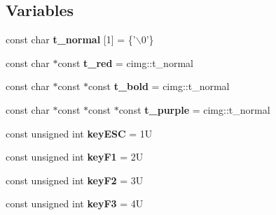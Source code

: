 \subsection*{Variables}
\begin{DoxyCompactItemize}
\item 
\hypertarget{namespacecimg__library_1_1cimg_a21ef52a3c2df8f112ed0cd94c0ff7417}{
const char {\bfseries t\_\-normal} \mbox{[}1\mbox{]} = \{'$\backslash$0'\}}
\label{namespacecimg__library_1_1cimg_a21ef52a3c2df8f112ed0cd94c0ff7417}

\item 
\hypertarget{namespacecimg__library_1_1cimg_a6ecafe64a12753c164fc400a891702fc}{
const char $\ast$const {\bfseries t\_\-red} = cimg::t\_\-normal}
\label{namespacecimg__library_1_1cimg_a6ecafe64a12753c164fc400a891702fc}

\item 
\hypertarget{namespacecimg__library_1_1cimg_adf940f5d27878472849db5021c8d6570}{
const char $\ast$const $\ast$const {\bfseries t\_\-bold} = cimg::t\_\-normal}
\label{namespacecimg__library_1_1cimg_adf940f5d27878472849db5021c8d6570}

\item 
\hypertarget{namespacecimg__library_1_1cimg_a56bfd6a63beb2cf797e8d97724e9390a}{
const char $\ast$const $\ast$const $\ast$const {\bfseries t\_\-purple} = cimg::t\_\-normal}
\label{namespacecimg__library_1_1cimg_a56bfd6a63beb2cf797e8d97724e9390a}

\item 
\hypertarget{namespacecimg__library_1_1cimg_adfae078959b4ad6d1695828a533088b0}{
const unsigned int {\bfseries keyESC} = 1U}
\label{namespacecimg__library_1_1cimg_adfae078959b4ad6d1695828a533088b0}

\item 
\hypertarget{namespacecimg__library_1_1cimg_a77b15159148b47f4b1088e5d76305439}{
const unsigned int {\bfseries keyF1} = 2U}
\label{namespacecimg__library_1_1cimg_a77b15159148b47f4b1088e5d76305439}

\item 
\hypertarget{namespacecimg__library_1_1cimg_a0d23f41f3a6ffef9c9bec1dd8e705d30}{
const unsigned int {\bfseries keyF2} = 3U}
\label{namespacecimg__library_1_1cimg_a0d23f41f3a6ffef9c9bec1dd8e705d30}

\item 
\hypertarget{namespacecimg__library_1_1cimg_a7221779329bd86e1e90110db72b58453}{
const unsigned int {\bfseries keyF3} = 4U}
\label{namespacecimg__library_1_1cimg_a7221779329bd86e1e90110db72b58453}


\end{DoxyCompactItemize}
